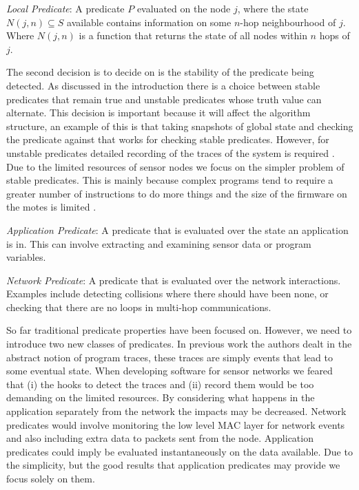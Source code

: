 \begin{mydef}
\emph{Local Predicate}: A predicate $P$ evaluated on the node $j$, where the state $N(j, n) \subseteq S$ available contains information on some $n$-hop neighbourhood of $j$. Where $N(j, n)$ is a function that returns the state of all nodes within $n$ hops of $j$.
\end{mydef}

The second decision is to decide on is the stability of the predicate being detected. As discussed in the introduction there is a choice between stable predicates that remain true and unstable predicates whose truth value can alternate. This decision is important because it will affect the algorithm structure, an example of this is that taking snapshots of global state and checking the predicate against that works for checking stable predicates. However, for unstable predicates detailed recording of the traces of the system is required \cite{bansod2004distributed}. Due to the limited resources of sensor nodes we focus on the simpler problem of stable predicates. This is mainly because complex programs tend to require a greater number of instructions to do more things and the size of the firmware on the motes is limited \cite{CM5000}.


\begin{mydef}
\emph{Application Predicate}: A predicate that is evaluated over the state an application is in. This can involve extracting and examining sensor data or program variables.
\end{mydef}

\begin{mydef}
\emph{Network Predicate}: A predicate that is evaluated over the network interactions. Examples include detecting collisions where there should have been none, or checking that there are no loops in multi-hop communications.
\end{mydef}

So far traditional predicate properties have been focused on. However, we need to introduce two new classes of predicates. In previous work the authors dealt in the abstract notion of program traces, these traces are simply events that lead to some eventual state. When developing software for sensor networks we feared that (i) the hooks to detect the traces and (ii) record them would be too demanding on the limited resources. By considering what happens in the application separately from the network the impacts may be decreased. Network predicates would involve monitoring the low level MAC layer for network events and also including extra data to packets sent from the node. Application predicates could imply be evaluated instantaneously on the data available. Due to the simplicity, but the good results that application predicates may provide we focus solely on them.

